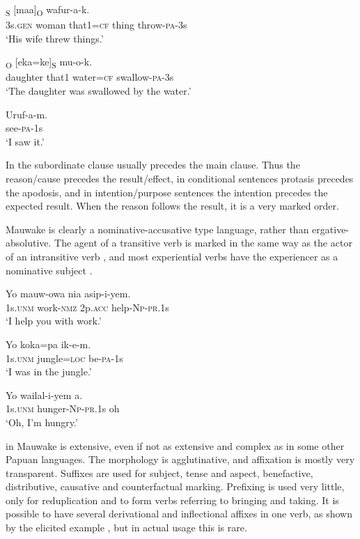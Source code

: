 \ea%
\label{ex:1:x656}
\gll [Ona  emeria  nain=ke]\textsubscript{S} [maa]\textsubscript{O} wafur-a-k. \\
 3s.\textsc{gen} woman  that1=\textsc{cf}  thing  throw-\textsc{pa}-3s \\
\glt `His wife threw things.'
\z


\ea%
\label{ex:1:x657}
\textsubscript{O} [eka=ke]\textsubscript{S} mu-o-k. \\
 daughter  that1  water=\textsc{cf} swallow-\textsc{pa}-3s     \\
\glt `The daughter was swallowed by the water.'
\z


\ea%
\label{ex:1:x659}
\gll Uruf-a-m. \\
 see-\textsc{pa}-1s     \\
\glt `I saw it.'
\z


In  the subordinate clause usually precedes the main clause.  Thus the reason/cause precedes the result/effect, in conditional sentences protasis precedes the apodosis, and in intention/purpose sentences the intention precedes the expected result. When the reason follows the result, it is a very marked order.

Mauwake is clearly a nominative-accusative type language, rather than ergative-absolutive. The agent of a transitive verb  is marked in the same way as the actor of an intransitive verb , and most experiential verbs have the experiencer as a nominative subject .

\ea%
\label{ex:1:x1523}
\gll Yo  mauw-owa  nia  asip-i-yem. \\
 1s.\textsc{unm}  work-\textsc{nmz}  2p.\textsc{acc}  help-\textsc{Np}-\textsc{pr}.1s     \\
\glt `I help you with work.'
\z


\ea%
\label{ex:1:x1524}
\gll Yo  koka=pa  ik-e-m. \\
1s.\textsc{unm}  jungle=\textsc{loc}  be-\textsc{pa}-1s      \\
\glt `I was in the jungle.'
\z


\ea%
\label{ex:1:x1525}
\gll Yo  wailal-i-yem  a. \\
 1s.\textsc{unm}  hunger-\textsc{Np}-\textsc{pr}.1s  oh     \\
\glt `Oh, I'm hungry.'
\z


 in Mauwake is extensive, even if not as extensive and complex as in some other Papuan languages. The morphology is agglutinative, and  affixation is mostly very transparent.  Suffixes are used for subject, tense and aspect, benefactive, distributive, causative and counterfactual marking. Prefixing is used very little, only for reduplication and to form verbs referring to bringing and taking. It is possible to have several derivational and inflectional affixes in one verb, as shown by the elicited example , but in actual usage this is rare.


